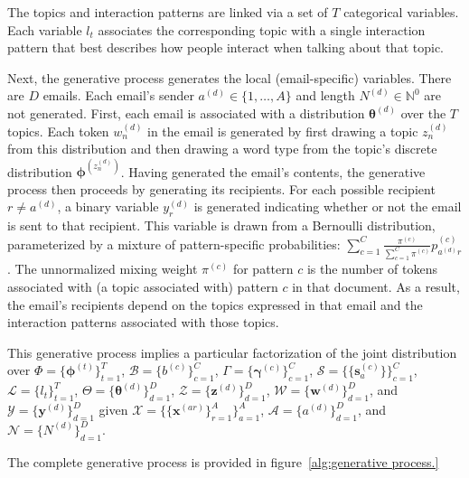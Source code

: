 \documentclass{pnastwo}
\newcommand{\bs}{\boldsymbol{s}}
\newcommand{\bw}{\boldsymbol{w}}
\newcommand{\bx}{\boldsymbol{x}}
\newcommand{\by}{\boldsymbol{y}}
\newcommand{\bz}{\boldsymbol{z}}
\newcommand{\bgamma}{\boldsymbol{\gamma}}
\newcommand{\bphi}{\boldsymbol{\phi}}
\newcommand{\btheta}{\boldsymbol{\theta}}
\begin{document}
\begin{article}
The topics and interaction patterns are linked via a set of $T$
categorical variables. Each variable $l_t$ associates the
corresponding topic with a single interaction pattern that best
describes how people interact when talking about that topic.

Next, the generative process generates the local (email-specific)
variables. There are $D$ emails. Each email's sender $a^{(d)} \in \{1,
\ldots, A\}$ and length $N^{(d)} \in \mathbb{N}^0$ are not
generated. First, each email is associated with a distribution
$\btheta^{(d)}$ over the $T$ topics. Each token $w_n^{(d)}$ in the
email is generated by first drawing a topic $z_n^{(d)}$ from this
distribution and then drawing a word type from the topic's discrete
distribution $\bphi^{(z_n^{(d)})}$. Having generated the email's
contents, the generative process then proceeds by generating its
recipients. For each possible recipient $r \neq a^{(d)}$, a binary
variable $y^{(d)}_r$ is generated indicating whether or not the email
is sent to that recipient. This variable is drawn from a Bernoulli
distribution, parameterized by a mixture of pattern-specific
probabilities: $\sum_{c=1}^C \frac{\pi^{(c)}}{\sum_{c=1}^C \pi^{(c)}}
p^{(c)}_{a^{(d)}r}$. The unnormalized mixing weight $\pi^{(c)}$ for
pattern $c$ is the number of tokens associated with (a topic
associated with) pattern $c$ in that document. As a result, the
email's recipients depend on the topics expressed in that email and
the interaction patterns associated with those topics.

This generative process implies a particular factorization of the
joint distribution over $\Phi = \{ \bphi^{(t)} \}_{t=1}^T$,
$\mathcal{B} = \{ b^{(c)} \}_{c=1}^C$, $\Gamma = \{ \bgamma^{(c)}
\}_{c=1}^C$, $\mathcal{S} = \{ \{ \bs^{(c)}_a \} \}_{c=1}^C$,
$\mathcal{L} = \{ l_t\}_{t=1}^T$, $\Theta = \{ \btheta^{(d)}
\}_{d=1}^D$, $\mathcal{Z} = \{ \bz^{(d)} \}_{d=1}^D$, $\mathcal{W} =
\{ \bw^{(d)} \}_{d=1}^D$, and $\mathcal{Y} = \{ \by^{(d)} \}_{d=1}^D$
given $\mathcal{X} = \{ \{ \bx^{(ar)} \}_{r=1}^A \}_{a=1}^A$,
$\mathcal{A} = \{ a^{(d)} \}_{d=1}^D$, and $\mathcal{N} = \{ N^{(d)}
\}_{d=1}^D$.

The complete generative process is provided in
figure~\ref{alg:generative process.}


\end{article}
\end{document}
